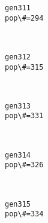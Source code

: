 \documentclass[11pt]{article}
\begin{document}
    \begin{Verbatim}[commandchars=\\\{\}]
gen311
pop\#=294

    \end{Verbatim}

    \begin{center}
    \end{center}
    { \hspace*{\fill} \\}
    
    \begin{Verbatim}[commandchars=\\\{\}]
gen312
pop\#=315

    \end{Verbatim}

    \begin{center}
    \end{center}
    { \hspace*{\fill} \\}
    
    \begin{Verbatim}[commandchars=\\\{\}]
gen313
pop\#=331

    \end{Verbatim}

    \begin{center}
    \end{center}
    { \hspace*{\fill} \\}
    
    \begin{Verbatim}[commandchars=\\\{\}]
gen314
pop\#=326

    \end{Verbatim}

    \begin{center}
    \end{center}
    { \hspace*{\fill} \\}
    
    \begin{Verbatim}[commandchars=\\\{\}]
gen315
pop\#=334

    \end{Verbatim}
\end{document}
